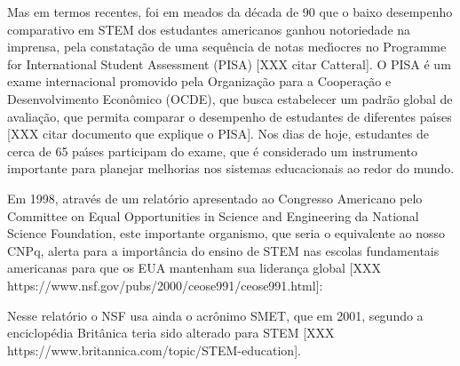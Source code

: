 \documentclass[
12pt,		%
openright,	%
twoside,  %
a4paper,			%
chapter=TITLE,		%
english,			%
french,				%
spanish,			%
brazil				%
]{USPSC-classe/USPSC_RedarTex}
\begin{document}
Mas em termos recentes, foi em meados da d\'ecada de 90 que o baixo desempenho comparativo em STEM dos estudantes americanos ganhou notoriedade na imprensa, pela constata\c{c}\~ao de uma sequ\^encia de notas med\'{\i}ocres no Programme for International Student Assessment (PISA) [XXX citar Catteral]. O PISA \'e um exame internacional promovido pela Organiza\c{c}\~ao para a Coopera\c{c}\~ao e Desenvolvimento Econ\^omico (OCDE), que busca estabelecer um padr\~ao global de avalia\c{c}\~ao, que permita comparar o desempenho de estudantes de diferentes pa\'{\i}ses [XXX citar documento que explique o PISA]. Nos dias de hoje, estudantes de cerca de 65 pa\'{\i}ses participam do exame, que \'e considerado um instrumento importante para planejar melhorias nos sistemas educacionais ao redor do mundo.








Em 1998, atrav\'es de um relat\'orio apresentado ao Congresso Americano pelo Committee on Equal Opportunities in Science and Engineering da National Science Foundation, este importante organismo, que seria o equivalente ao nosso CNPq, alerta para a import\^ancia do ensino de STEM nas escolas fundamentais americanas para que os EUA mantenham sua lideran\c{c}a global [XXX https://www.nsf.gov/pubs/2000/ceose991/ceose991.html]:









\noindent\begin{center}\mbox{\centering{}}\end{center}


Nesse relat\'orio o NSF usa ainda o acr\^onimo SMET, que em 2001, segundo a enciclop\'edia Brit\^anica teria sido alterado para STEM [XXX https://www.britannica.com/topic/STEM-education].
\end{document}
